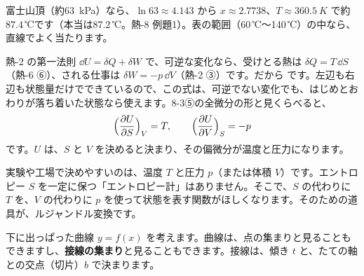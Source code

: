 \begin{phmijika}
富士山頂（約\qty{63}{kPa}）なら、$\ln63\approx4.143$ から $x\approx2.7738$、$T\approx\qty{360.5}{K}$ で約87.4\,℃です（本当は87.2\,℃。熱-8 例題1）。表の範囲（60\,℃〜140\,℃）の中なら、直線でよく当たります。
\end{phmijika}

\phkokomade


\label{ph:熱-10:sec5}
熱-2 の第一法則 $\dd U=\delta Q+\delta W$ で、可逆な変化なら、受けとる熱は $\delta Q=T\,\dd S$（熱-6 ⑥）、される仕事は $\delta W=-p\,\dd V$（熱-2 ③）です。だから
です。左辺も右辺も状態量だけでできているので、この式は、可逆でない変化でも、はじめとおわりが落ち着いた状態なら使えます。8-3⑤の全微分の形と見くらべると、
\[\Bigl(\frac{\partial U}{\partial S}\Bigr)_V=T,\qquad\Bigl(\frac{\partial U}{\partial V}\Bigr)_S=-p\]
です。$U$ は、$S$ と $V$ を決めると決まり、その偏微分が温度と圧力になります。

実験や工場で決めやすいのは、温度 $T$ と圧力 $p$（または体積 $V$）です。エントロピー $S$ を一定に保つ「エントロピー計」はありません。そこで、$S$ の代わりに $T$ を、$V$ の代わりに $p$ を使って状態を表す関数がほしくなります。そのための道具が、ルジャンドル変換です。

下に出っぱった曲線 $y=f(x)$ を考えます。曲線は、点の集まりと見ることもできますし、\textbf{接線の集まり}と見ることもできます。接線は、傾き $t$ と、たての軸との交点（切片）$b$ で決まります。

